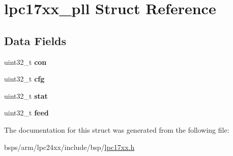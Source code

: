 \hypertarget{structlpc17xx__pll}{}\section{lpc17xx\+\_\+pll Struct Reference}
\label{structlpc17xx__pll}
\subsection*{Data Fields}
\begin{DoxyCompactItemize}
\item 
\mbox{\label{structlpc17xx__pll_af8c7b954c13ed0239742e748b7e0b4b6}} 
uint32\+\_\+t {\bfseries con}
\item 
\mbox{\label{structlpc17xx__pll_a9cb75d9f94ca008ad9c290d0e0a836e3}} 
uint32\+\_\+t {\bfseries cfg}
\item 
\mbox{\label{structlpc17xx__pll_ade8a6183b2f43996afeaa6689461ea59}} 
uint32\+\_\+t {\bfseries stat}
\item 
\mbox{\label{structlpc17xx__pll_af5906634cbe281c0c0fe1885eb06a901}} 
uint32\+\_\+t {\bfseries feed}
\end{DoxyCompactItemize}


The documentation for this struct was generated from the following file\+:\begin{DoxyCompactItemize}
\item 
bsps/arm/lpc24xx/include/bsp/\mbox{\hyperlink{lpc17xx_8h}{lpc17xx.\+h}}\end{DoxyCompactItemize}
